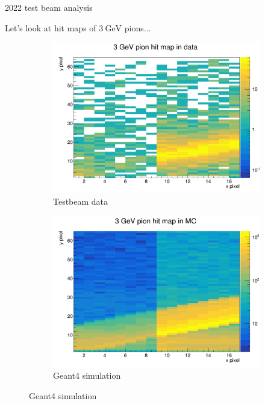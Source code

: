 \documentclass[xcolor={dvipsnames}]{beamer}
\begin{document}
\begin{frame}{2022 test beam analysis}
  \begin{center}
    \Large{Let's look at hit maps of $\SI{3}{\giga\eV}$ pions...}
  \end{center}
  \begin{figure}
    \centering
    \begin{subfigure}{0.5\textwidth}
      \includegraphics[width = 1.0\textwidth]{Figs/HitMap_Pos8_Pion_3GeV_Data.png}
      \caption{Testbeam data}
    \end{subfigure}%
    \begin{subfigure}{0.5\textwidth}
      \includegraphics[width = 1.0\textwidth]{Figs/HitMap_Pos8_Pion_3GeV_MC.png}
      \caption{Geant4 simulation}
    \end{subfigure}%
  \end{figure}
\end{frame}
\end{document}
